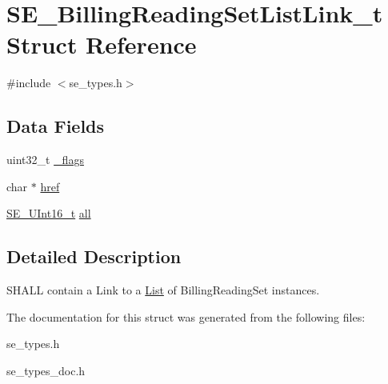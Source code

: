 \hypertarget{structSE__BillingReadingSetListLink__t}{}\section{S\+E\+\_\+\+Billing\+Reading\+Set\+List\+Link\+\_\+t Struct Reference}
\label{structSE__BillingReadingSetListLink__t}


{\ttfamily \#include $<$se\+\_\+types.\+h$>$}

\subsection*{Data Fields}
\begin{DoxyCompactItemize}
\item 
uint32\+\_\+t \hyperlink{group__BillingReadingSetListLink_ga7cfb529e92b421be1aa44dfcbb17909b}{\+\_\+flags}
\item 
char $\ast$ \hyperlink{group__BillingReadingSetListLink_gabf4398b5db8e7276bafa26793d8db6bc}{href}
\item 
\hyperlink{group__UInt16_gac68d541f189538bfd30cfaa712d20d29}{S\+E\+\_\+\+U\+Int16\+\_\+t} \hyperlink{group__BillingReadingSetListLink_ga317f96fbbbd92707b6af50aaa8fa2865}{all}
\end{DoxyCompactItemize}


\subsection{Detailed Description}
S\+H\+A\+LL contain a Link to a \hyperlink{structList}{List} of Billing\+Reading\+Set instances. 

The documentation for this struct was generated from the following files\+:\begin{DoxyCompactItemize}
\item 
se\+\_\+types.\+h\item 
se\+\_\+types\+\_\+doc.\+h\end{DoxyCompactItemize}
